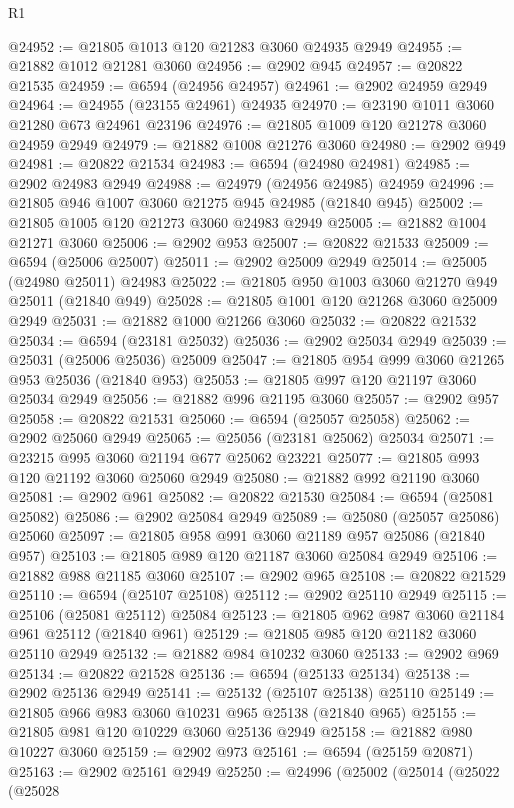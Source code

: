 \begin{lexlean}{R1}
\begin{coremodule}
@24952 := @21805 @1013 @120 @21283 @3060 @24935 @2949
@24955 := @21882 @1012 @21281 @3060
@24956 := @2902 @945
@24957 := @20822 @21535
@24959 := @6594 (@24956 @24957)
@24961 := @2902 @24959 @2949
@24964 := @24955 (@23155 @24961) @24935
@24970 := @23190 @1011 @3060 @21280 @673 @24961 @23196
@24976 := @21805 @1009 @120 @21278 @3060 @24959 @2949
@24979 := @21882 @1008 @21276 @3060
@24980 := @2902 @949
@24981 := @20822 @21534
@24983 := @6594 (@24980 @24981)
@24985 := @2902 @24983 @2949
@24988 := @24979 (@24956 @24985) @24959
@24996 := @21805 @946 @1007 @3060 @21275 @945 @24985 (@21840 @945)
@25002 := @21805 @1005 @120 @21273 @3060 @24983 @2949
@25005 := @21882 @1004 @21271 @3060
@25006 := @2902 @953
@25007 := @20822 @21533
@25009 := @6594 (@25006 @25007)
@25011 := @2902 @25009 @2949
@25014 := @25005 (@24980 @25011) @24983
@25022 := @21805 @950 @1003 @3060 @21270 @949 @25011 (@21840 @949)
@25028 := @21805 @1001 @120 @21268 @3060 @25009 @2949
@25031 := @21882 @1000 @21266 @3060
@25032 := @20822 @21532
@25034 := @6594 (@23181 @25032)
@25036 := @2902 @25034 @2949
@25039 := @25031 (@25006 @25036) @25009
@25047 := @21805 @954 @999 @3060 @21265 @953 @25036 (@21840 @953)
@25053 := @21805 @997 @120 @21197 @3060 @25034 @2949
@25056 := @21882 @996 @21195 @3060
@25057 := @2902 @957
@25058 := @20822 @21531
@25060 := @6594 (@25057 @25058)
@25062 := @2902 @25060 @2949
@25065 := @25056 (@23181 @25062) @25034
@25071 := @23215 @995 @3060 @21194 @677 @25062 @23221
@25077 := @21805 @993 @120 @21192 @3060 @25060 @2949
@25080 := @21882 @992 @21190 @3060
@25081 := @2902 @961
@25082 := @20822 @21530
@25084 := @6594 (@25081 @25082)
@25086 := @2902 @25084 @2949
@25089 := @25080 (@25057 @25086) @25060
@25097 := @21805 @958 @991 @3060 @21189 @957 @25086 (@21840 @957)
@25103 := @21805 @989 @120 @21187 @3060 @25084 @2949
@25106 := @21882 @988 @21185 @3060
@25107 := @2902 @965
@25108 := @20822 @21529
@25110 := @6594 (@25107 @25108)
@25112 := @2902 @25110 @2949
@25115 := @25106 (@25081 @25112) @25084
@25123 := @21805 @962 @987 @3060 @21184 @961 @25112 (@21840 @961)
@25129 := @21805 @985 @120 @21182 @3060 @25110 @2949
@25132 := @21882 @984 @10232 @3060
@25133 := @2902 @969
@25134 := @20822 @21528
@25136 := @6594 (@25133 @25134)
@25138 := @2902 @25136 @2949
@25141 := @25132 (@25107 @25138) @25110
@25149 := @21805 @966 @983 @3060 @10231 @965 @25138 (@21840 @965)
@25155 := @21805 @981 @120 @10229 @3060 @25136 @2949
@25158 := @21882 @980 @10227 @3060
@25159 := @2902 @973
@25161 := @6594 (@25159 @20871)
@25163 := @2902 @25161 @2949
@25250 := @24996
    (@25002
      (@25014
        (@25022
          (@25028

\end{coremodule}
\end{lexlean}
